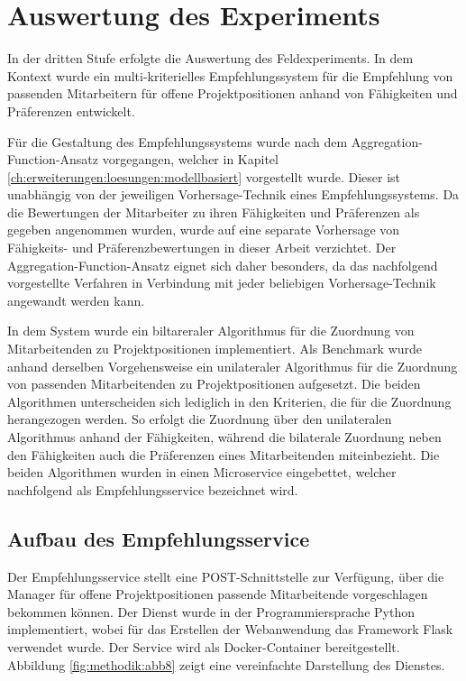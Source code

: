 \section{Auswertung des Experiments}
In der dritten Stufe erfolgte die Auswertung des Feldexperiments.
In dem Kontext wurde ein multi-kriterielles Empfehlungssystem für die Empfehlung von passenden Mitarbeitern für offene Projektpositionen anhand von Fähigkeiten und Präferenzen entwickelt.

Für die Gestaltung des Empfehlungssystems wurde nach dem Aggregation-Function-Ansatz vorgegangen, welcher in Kapitel \ref{ch:erweiterungen:loesungen:modellbasiert} vorgestellt wurde.
Dieser ist unabhängig von der jeweiligen Vorhersage-Technik eines Empfehlungssystems.
Da die Bewertungen der Mitarbeiter zu ihren Fähigkeiten und Präferenzen als gegeben angenommen wurden, wurde auf eine separate Vorhersage von Fähigkeits- und Präferenzbewertungen in dieser Arbeit verzichtet.
Der Aggregation-Function-Ansatz eignet sich daher besonders, da das nachfolgend vorgestellte Verfahren in Verbindung mit jeder beliebigen Vorhersage-Technik angewandt werden kann.

In dem System wurde ein biltareraler Algorithmus für die Zuordnung von Mitarbeitenden zu Projektpositionen implementiert.
Als Benchmark wurde anhand derselben Vorgehensweise ein unilateraler Algorithmus für die Zuordnung von passenden Mitarbeitenden zu Projektpositionen aufgesetzt.
Die beiden Algorithmen unterscheiden sich lediglich in den Kriterien, die für die Zuordnung herangezogen werden.
So erfolgt die Zuordnung über den unilateralen Algorithmus anhand der Fähigkeiten, während die bilaterale Zuordnung neben den Fähigkeiten auch die Präferenzen eines Mitarbeitenden miteinbezieht.
Die beiden Algorithmen wurden in einen Microservice eingebettet, welcher nachfolgend als Empfehlungsservice bezeichnet wird.

\subsection{Aufbau des Empfehlungsservice}
Der Empfehlungsservice stellt eine POST-Schnittstelle zur Verfügung, über die Manager für offene Projektpositionen passende Mitarbeitende vorgeschlagen bekommen können.
Der Dienst wurde in der Programmiersprache Python implementiert, wobei für das Erstellen der Webanwendung das Framework Flask verwendet wurde.
Der Service wird als Docker-Container bereitgestellt.
Abbildung \ref{fig:methodik:abb8} zeigt eine vereinfachte Darstellung des Dienstes.

